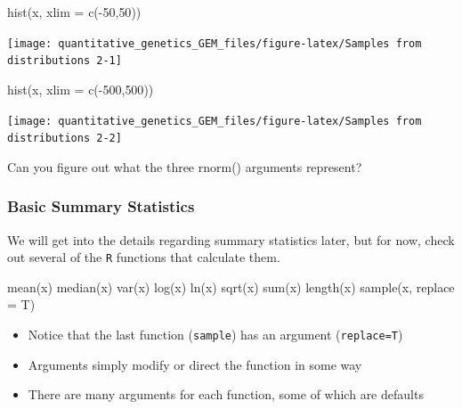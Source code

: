 \documentclass[
]{book}
\newenvironment{Shaded}{\begin{snugshade}}{\end{snugshade}}
\newcommand{\AttributeTok}[1]{\textcolor[rgb]{0.77,0.63,0.00}{#1}}
\newcommand{\DecValTok}[1]{\textcolor[rgb]{0.00,0.00,0.81}{#1}}
\newcommand{\FunctionTok}[1]{\textcolor[rgb]{0.00,0.00,0.00}{#1}}
\newcommand{\NormalTok}[1]{#1}
\newcommand{\SpecialCharTok}[1]{\textcolor[rgb]{0.00,0.00,0.00}{#1}}
\begin{document}
\begin{Shaded}
\begin{Highlighting}[]
\FunctionTok{hist}\NormalTok{(x, }\AttributeTok{xlim =} \FunctionTok{c}\NormalTok{(}\SpecialCharTok{{-}}\DecValTok{50}\NormalTok{,}\DecValTok{50}\NormalTok{))}
\end{Highlighting}
\end{Shaded}

\texttt{[image: quantitative\_genetics\_GEM\_files/figure-latex/Samples from distributions 2-1]}

\begin{Shaded}
\begin{Highlighting}[]
\FunctionTok{hist}\NormalTok{(x, }\AttributeTok{xlim =} \FunctionTok{c}\NormalTok{(}\SpecialCharTok{{-}}\DecValTok{500}\NormalTok{,}\DecValTok{500}\NormalTok{))}
\end{Highlighting}
\end{Shaded}

\texttt{[image: quantitative\_genetics\_GEM\_files/figure-latex/Samples from distributions 2-2]}

Can you figure out what the three rnorm() arguments represent?

\hypertarget{basic-summary-statistics}{%
\subsubsection{Basic Summary Statistics}\label{basic-summary-statistics}}

We will get into the details regarding summary statistics later, but for now, check out several of the \texttt{R} functions that calculate them.

\begin{Shaded}
\begin{Highlighting}[]
\FunctionTok{mean}\NormalTok{(x)}
\FunctionTok{median}\NormalTok{(x)}
\FunctionTok{var}\NormalTok{(x)}
\FunctionTok{log}\NormalTok{(x)}
\FunctionTok{ln}\NormalTok{(x)}
\FunctionTok{sqrt}\NormalTok{(x)}
\FunctionTok{sum}\NormalTok{(x)}
\FunctionTok{length}\NormalTok{(x)}
\FunctionTok{sample}\NormalTok{(x, }\AttributeTok{replace =}\NormalTok{ T)}
\end{Highlighting}
\end{Shaded}

\begin{itemize}
\item
  Notice that the last function (\texttt{sample}) has an argument (\texttt{replace=T})
\item
  Arguments simply modify or direct the function in some way
\item
  There are many arguments for each function, some of which are defaults
\end{itemize}
\end{document}

